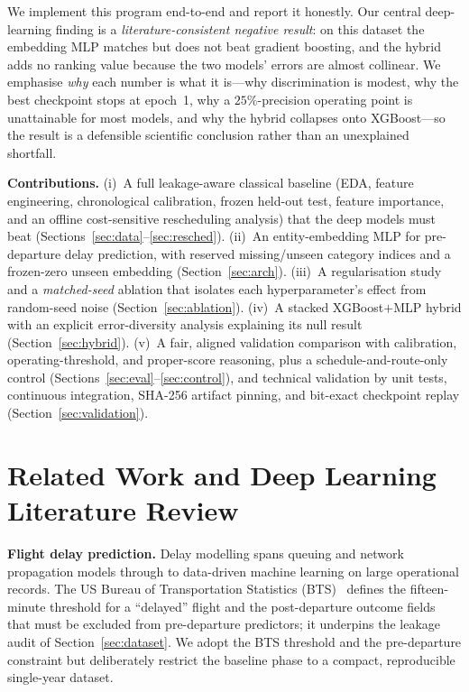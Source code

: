 \documentclass[conference]{IEEEtran}
\begin{document}
We implement this program end-to-end and report it honestly. Our central
deep-learning finding is a \emph{literature-consistent negative result}: on this
dataset the embedding MLP matches but does not beat gradient boosting, and the
hybrid adds no ranking value because the two models' errors are almost collinear.
We emphasise \emph{why} each number is what it is---why discrimination is modest,
why the best checkpoint stops at epoch~1, why a $25\%$-precision operating point
is unattainable for most models, and why the hybrid collapses onto XGBoost---so
the result is a defensible scientific conclusion rather than an unexplained
shortfall.

\textbf{Contributions.}
(i)~A full leakage-aware classical baseline (EDA, feature engineering,
chronological calibration, frozen held-out test, feature importance, and an
offline cost-sensitive rescheduling analysis) that the deep models must beat
(Sections~\ref{sec:data}--\ref{sec:resched}).
(ii)~An entity-embedding MLP for pre-departure delay prediction, with reserved
missing/unseen category indices and a frozen-zero unseen embedding
(Section~\ref{sec:arch}).
(iii)~A regularisation study and a \emph{matched-seed} ablation that isolates
each hyperparameter's effect from random-seed noise (Section~\ref{sec:ablation}).
(iv)~A stacked XGBoost$+$MLP hybrid with an explicit error-diversity analysis
explaining its null result (Section~\ref{sec:hybrid}).
(v)~A fair, aligned validation comparison with calibration, operating-threshold,
and proper-score reasoning, plus a schedule-and-route-only control
(Sections~\ref{sec:eval}--\ref{sec:control}), and technical validation by unit
tests, continuous integration, SHA-256 artifact pinning, and bit-exact
checkpoint replay (Section~\ref{sec:validation}).

\section{Related Work and Deep Learning Literature Review}
\label{sec:related}
\textbf{Flight delay prediction.} Delay modelling spans queuing and network
propagation models through to data-driven machine learning on large operational
records. The US Bureau of Transportation Statistics (BTS)~\cite{bts} defines the
fifteen-minute threshold for a ``delayed'' flight and the post-departure outcome
fields that must be excluded from pre-departure predictors; it underpins the
leakage audit of Section~\ref{sec:dataset}. We adopt the BTS threshold and the
pre-departure constraint but deliberately restrict the baseline phase to a
compact, reproducible single-year dataset.
\end{document}
